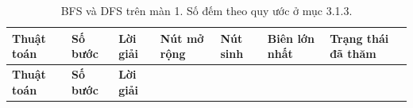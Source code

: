 \begin{longtable}[]{@{}
  >{\raggedright\arraybackslash}p{}
  >{\raggedright\arraybackslash}p{}
  >{\raggedright\arraybackslash}p{}
  >{\raggedright\arraybackslash}p{}
  >{\raggedright\arraybackslash}p{}
  >{\raggedright\arraybackslash}p{}
  >{\raggedright\arraybackslash}p{}@{}}
\caption{ BFS và DFS trên màn 1. Số đếm theo quy ước ở mục 3.1.3.}\tabularnewline
\toprule\noalign{}
\rowcolor{tablehead}\begin{minipage}[b]{\linewidth}\raggedright
\textbf{Thuật toán}
\end{minipage} & \begin{minipage}[b]{\linewidth}\raggedright
\textbf{Số bước}
\end{minipage} & \begin{minipage}[b]{\linewidth}\raggedright
\textbf{Lời giải}
\end{minipage} & \begin{minipage}[b]{\linewidth}\raggedright
\textbf{Nút mở rộng}
\end{minipage} & \begin{minipage}[b]{\linewidth}\raggedright
\textbf{Nút sinh}
\end{minipage} & \begin{minipage}[b]{\linewidth}\raggedright
\textbf{Biên lớn nhất}
\end{minipage} & \begin{minipage}[b]{\linewidth}\raggedright
\textbf{Trạng thái đã thăm}
\end{minipage} \\
\midrule\noalign{}
\endfirsthead
\toprule\noalign{}
\rowcolor{tablehead}\begin{minipage}[b]{\linewidth}\raggedright
\textbf{Thuật toán}
\end{minipage} & \begin{minipage}[b]{\linewidth}\raggedright
\textbf{Số bước}
\end{minipage} & \begin{minipage}[b]{\linewidth}\raggedright
\textbf{Lời giải}
\end{minipage} & \begin{minipage}[b]{\linewidth}\raggedright

\end{minipage}
\end{longtable}
